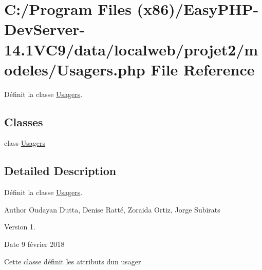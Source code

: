 \hypertarget{_usagers_8php}{}\section{C\+:/\+Program Files (x86)/\+Easy\+P\+H\+P-\/\+Dev\+Server-\/14.1\+V\+C9/data/localweb/projet2/modeles/\+Usagers.php File Reference}
\label{_usagers_8php}


Définit la classe \hyperlink{class_usagers}{Usagers}.  


\subsection*{Classes}
\begin{DoxyCompactItemize}
\item 
class \hyperlink{class_usagers}{Usagers}
\end{DoxyCompactItemize}


\subsection{Detailed Description}
Définit la classe \hyperlink{class_usagers}{Usagers}. 

\begin{DoxyAuthor}{Author}
Oudayan Dutta, Denise Ratté, Zoraida Ortiz, Jorge Subirats 
\end{DoxyAuthor}
\begin{DoxyVersion}{Version}
1. 
\end{DoxyVersion}
\begin{DoxyDate}{Date}
9 février 2018
\end{DoxyDate}
Cette classe définit les attributs d\textquotesingle{}un usager 